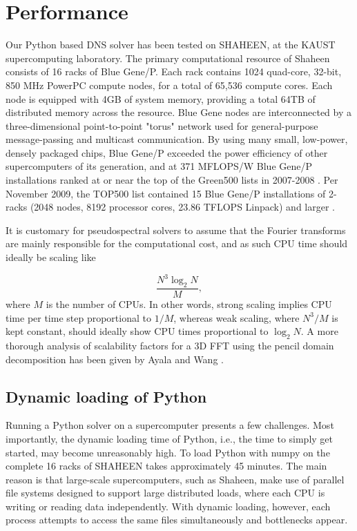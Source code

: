 \documentclass[11pt, oneside]{article}
\begin{document}
\section{Performance}
Our Python based DNS solver has been tested on SHAHEEN, at the KAUST supercomputing laboratory. The primary computational resource of Shaheen consists of 16 racks of Blue Gene/P. Each rack contains 1024 quad-core, 32-bit, 850 MHz PowerPC compute nodes, for a total of 65,536 compute cores. Each node is equipped with 4GB of system memory, providing a total 64TB of distributed memory across the resource. Blue Gene nodes are interconnected by a three-dimensional point-to-point "torus" network used for general-purpose message-passing and multicast communication. By using many small, low-power, densely packaged chips, Blue Gene/P exceeded the power efficiency of other supercomputers of its generation, and at 371 MFLOPS/W Blue Gene/P installations ranked at or near the top of the Green500 lists in 2007-2008 \cite{top500green}.  Per November 2009, the TOP500 list contained 15 Blue Gene/P installations of 2-racks (2048 nodes, 8192 processor cores, 23.86 TFLOPS Linpack) and larger \cite{top500}.

It is customary for pseudospectral solvers to assume that the Fourier transforms are mainly responsible for the computational cost, and as such CPU time should ideally be scaling like

\begin{equation}
 \frac{N^3 \log_2 N}{M},
\end{equation}
where $M$ is the number of CPUs. In other words, strong scaling implies CPU time per time step proportional to $1/M$, whereas weak scaling, where $N^3/M$ is kept constant, should ideally show CPU times proportional to $\log_2 N$. A more thorough analysis of scalability factors for a 3D FFT using the pencil domain decomposition has been given by Ayala and Wang \cite{ayala2013}.

\subsection{Dynamic loading of Python}
Running a Python solver on a supercomputer presents a few challenges. Most importantly, the dynamic loading time of Python, i.e., the time to simply get started, may become unreasonably high. To load Python with numpy on the complete 16 racks of SHAHEEN takes approximately 45 minutes. The main reason is that large-scale supercomputers, such as Shaheen, make use of parallel file systems designed to support large distributed loads, where each CPU is writing or reading data independently. With dynamic loading, however, each process attempts to access the same files simultaneously and bottlenecks appear. 
\end{document}
